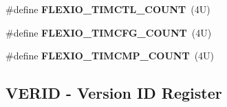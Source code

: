 \begin{DoxyCompactItemize}
\#define {\bfseries F\+L\+E\+X\+I\+O\+\_\+\+T\+I\+M\+C\+T\+L\+\_\+\+C\+O\+U\+NT}~(4\+U)
\item 
\mbox{\label{group___f_l_e_x_i_o___register___masks_ga5fd2177e2394e6ea374d5074bfd2284e}} 
\#define {\bfseries F\+L\+E\+X\+I\+O\+\_\+\+T\+I\+M\+C\+F\+G\+\_\+\+C\+O\+U\+NT}~(4\+U)
\item 
\mbox{\label{group___f_l_e_x_i_o___register___masks_gad43b95c740d12e20bb5804c0e310932a}} 
\#define {\bfseries F\+L\+E\+X\+I\+O\+\_\+\+T\+I\+M\+C\+M\+P\+\_\+\+C\+O\+U\+NT}~(4\+U)
\end{DoxyCompactItemize}
\subsection*{V\+E\+R\+ID -\/ Version ID Register}
